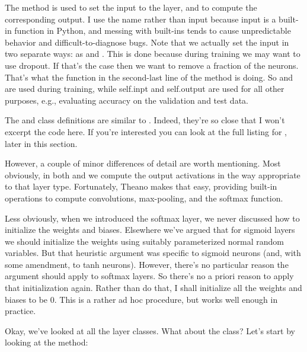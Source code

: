 \documentclass[a4paper,twoside,10pt]{book}
\begin{document}
The  method is used to set the input to the layer, and to compute the corresponding output. I use the name  rather than input because input is a built-in function in Python, and messing with built-ins tends to cause unpredictable behavior and difficult-to-diagnose bugs. Note that we actually set the input in two separate ways: as  and . This is done because during training we may want to use dropout. If that's the case then we want to remove a fraction  of the neurons. That's what the function  in the second-last line of the  method is doing. So  and  are used during training, while self.inpt and self.output are used for all other purposes, e.g., evaluating accuracy on the validation and test data.

The  and  class definitions are similar to . Indeed, they're so close that I won't excerpt the code here. If you're interested you can look at the full listing for , later in this section.

However, a couple of minor differences of detail are worth mentioning. Most obviously, in both  and  we compute the output activations in the way appropriate to that layer type. Fortunately, Theano makes that easy, providing built-in operations to compute convolutions, max-pooling, and the softmax function.

Less obviously, when we introduced the softmax layer, we never discussed how to initialize the weights and biases. Elsewhere we've argued that for sigmoid layers we should initialize the weights using suitably parameterized normal random variables. But that heuristic argument was specific to sigmoid neurons (and, with some amendment, to tanh neurons). However, there's no particular reason the argument should apply to softmax layers. So there's no a priori reason to apply that initialization again. Rather than do that, I shall initialize all the weights and biases to be 0. This is a rather ad hoc procedure, but works well enough in practice.

Okay, we've looked at all the layer classes. What about the  class? Let's start by looking at the  method:
\end{document}
